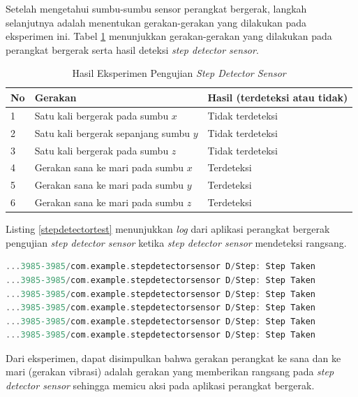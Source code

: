 Setelah mengetahui sumbu-sumbu sensor perangkat bergerak, langkah selanjutnya adalah menentukan gerakan-gerakan yang dilakukan pada eksperimen ini. Tabel \ref{tab:step-detector-test} menunjukkan gerakan-gerakan yang dilakukan pada perangkat bergerak serta hasil deteksi \textit{step detector sensor}.

\begin{table}[]
    \centering
    \caption{Hasil Eksperimen Pengujian \textit{Step Detector Sensor}}
    \begin{tabular}{|p{1cm}||p{4cm}|p{4cm}|}
    \hline
       No  & Gerakan & Hasil (terdeteksi atau tidak) \\
    \hline
        1 &  Satu kali bergerak pada sumbu $x$ & Tidak terdeteksi \\
    \hline
        2 &  Satu kali bergerak sepanjang sumbu $y$ & Tidak terdeteksi \\
    \hline
        3 &  Satu kali bergerak pada sumbu $z$ & Tidak terdeteksi\\
    \hline
    	4 &  Gerakan sana ke mari pada sumbu $x$ & Terdeteksi\\
    \hline
    	5 &  Gerakan sana ke mari pada sumbu $y$ & Terdeteksi\\
    \hline
    	6 &  Gerakan sana ke mari pada sumbu $z$ & Terdeteksi\\
    \hline
    \end{tabular}
    \label{tab:step-detector-test}
\end{table}

Listing \ref{stepdetectortest} menunjukkan \textit{log} dari aplikasi perangkat bergerak pengujian \textit{step detector sensor} ketika \textit{step detector sensor} mendeteksi rangsang. 

\begin{lstlisting}[language=C,frame=single,caption=\textit{Log console} Pengujian Sensor \textit{Step Detector} Ketika Mendeteksi Langkah Kaki,label=stepdetectortest]
...3985-3985/com.example.stepdetectorsensor D/Step: Step Taken 
...3985-3985/com.example.stepdetectorsensor D/Step: Step Taken 
...3985-3985/com.example.stepdetectorsensor D/Step: Step Taken 
...3985-3985/com.example.stepdetectorsensor D/Step: Step Taken 
...3985-3985/com.example.stepdetectorsensor D/Step: Step Taken
...3985-3985/com.example.stepdetectorsensor D/Step: Step Taken

\end{lstlisting}

Dari eksperimen, dapat disimpulkan bahwa gerakan perangkat ke sana dan ke mari (gerakan vibrasi) adalah gerakan yang memberikan rangsang pada \textit{step detector sensor} sehingga memicu aksi pada aplikasi perangkat bergerak.

